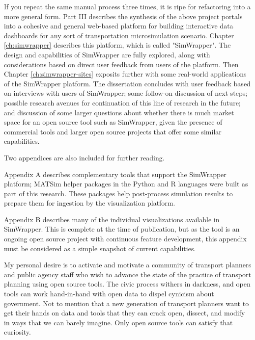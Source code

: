 If you repeat the same manual process three times, it is ripe for refactoring into a more general form. Part III describes the synthesis of the above project portals into a cohesive and general web-based platform for building interactive data dashboards for any sort of transportation microsimulation scenario. Chapter \ref{ch:simwrapper} describes this platform, which is called "SimWrapper". The design and capabilities of SimWrapper are fully explored, along with considerations based on direct user feedback from users of the platform. Then Chapter \ref{ch:simwrapper-sites} exposits further with some real-world applications of the SimWrapper platform. The dissertation concludes with user feedback based on interviews with users of SimWrapper; some follow-on discussion of next steps; possible research avenues for continuation of this line of research in the future; and discussion of some larger questions about whether there is much market space for an open source tool such as SimWrapper, given the presence of commercial tools and larger open source projects that offer some similar capabilities.

Two appendices are also included for further reading.

Appendix A describes complementary tools that support the SimWrapper platform; MATSim helper packages in the Python and R languages were built as part of this research. These packages help post-process simulation results to prepare them for ingestion by the visualization platform.

Appendix B describes many of the individual visualizations available in SimWrapper. This is complete at the time of publication, but as the tool is an ongoing open source project with continuous feature development, this appendix must be considered as a simple snapshot of current capabilities.

My personal desire is to activate and motivate a community of transport planners and public agency staff who wish to advance the state of the practice of transport planning using open source tools. The civic process withers in darkness, and open tools can work hand-in-hand with open data to dispel cynicism about government. Not to mention that a new generation of transport planners want to get their hands on data and tools that they can crack open, dissect, and modify in ways that we can barely imagine. Only open source tools can satisfy that curiosity.
